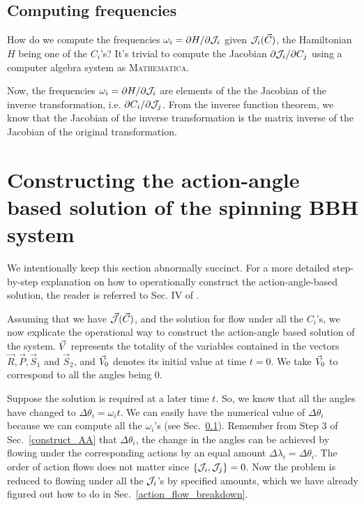 \subsection{Computing frequencies}    \label{compute_freq}


How do we compute the frequencies $\omega_i = \partial H/\partial \mathcal{J}_i$ given 
$\mathcal{J}_i(\vec{C})$, the Hamiltonian $H$ being one of the $C_i$'s?
It's trivial to compute the Jacobian $\partial \mathcal{J}_i/\partial C_j$ using 
a computer algebra system as \textsc{Mathematica}. 


Now, the frequencies $\omega_i = \partial H/\partial \mathcal{J}_i$ are elements of the 
the Jacobian of the inverse transformation, i.e. 
$\partial C_i/\partial \mathcal{J}_j$. From the inverse function theorem, we know 
that the Jacobian of the inverse transformation is the matrix 
inverse of the Jacobian of the original transformation.




\section{Constructing the action-angle based solution of the spinning BBH system}


We intentionally keep this section abnormally succinct. For a more detailed
step-by-step explanation on how to operationally construct the action-angle-based
solution, the reader is referred to Sec. IV of \cite{next_paper}.




Assuming that we have $\vec{\mathcal{J}}(\vec{C})$, and the solution for flow under
all the $C_i$'s, we now explicate the operational way to construct the
action-angle based solution of the system. $\vec{V}$ represents the totality of
the variables contained in the vectors $\vec{R}, \vec{P}, \vec{S}_1$ and $\vec{S}_2$,
and $\vec{V}_0$ denotes its initial value at time $t=0$.
We take $\vec{V}_0$ to correspond to all the angles being 0.


Suppose the solution is required at  a later time $t$. So, we know that
all the angles have changed to $\Delta \theta_i = \omega_i t$. 
We can easily have the numerical value of $\Delta \theta_i$ because we 
can compute all the $\omega_i$'s (see Sec.~\ref{compute_freq}).
Remember from Step 3 of Sec.~\ref{construct_AA}
that $\Delta \theta_i$, the change in the angles can be achieved by flowing 
under the corresponding actions by an equal amount
$\Delta \lambda_i = \Delta \theta_i$. The order of action flows does not matter
since $\left\lbrace \mathcal{J}_i, \mathcal{J}_j \right\rbrace = 0$. Now the problem is reduced to flowing 
under all the $\mathcal{J}_i$'s by specified amounts, which we have
already figured out how to do in Sec.~\ref{action_flow_breakdown}.





